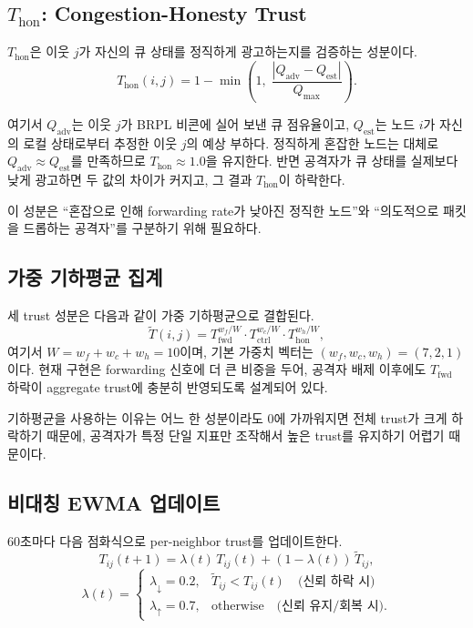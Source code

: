 \documentclass[12pt,a4paper]{article}
\begin{document}
\subsection{$T_\text{hon}$: Congestion-Honesty Trust}

$T_\text{hon}$은 이웃 $j$가 자신의 큐 상태를 정직하게 광고하는지를
검증하는 성분이다.
\begin{equation}
  T_\text{hon}(i,j) = 1 - \min\!\left(1,\; \frac{|Q_\text{adv} - Q_\text{est}|}{Q_\text{max}}\right).
\end{equation}

여기서 $Q_\text{adv}$는 이웃 $j$가 BRPL 비콘에 실어 보낸 큐 점유율이고,
$Q_\text{est}$는 노드 $i$가 자신의 로컬 상태로부터 추정한
이웃 $j$의 예상 부하다. 정직하게 혼잡한 노드는 대체로
$Q_\text{adv} \approx Q_\text{est}$를 만족하므로 $T_\text{hon} \approx 1.0$을 유지한다.
반면 공격자가 큐 상태를 실제보다 낮게 광고하면 두 값의 차이가 커지고,
그 결과 $T_\text{hon}$이 하락한다.

이 성분은 ``혼잡으로 인해 forwarding rate가 낮아진 정직한 노드''와
``의도적으로 패킷을 드롭하는 공격자''를 구분하기 위해 필요하다.

\subsection{가중 기하평균 집계}

세 trust 성분은 다음과 같이 가중 기하평균으로 결합된다.
\begin{equation}
  \tilde{T}(i,j) =
  T_\text{fwd}^{w_f/W}
  \cdot
  T_\text{ctrl}^{w_c/W}
  \cdot
  T_\text{hon}^{w_h/W},
\end{equation}
여기서 $W = w_f + w_c + w_h = 10$이며, 기본 가중치 벡터는
$(w_f, w_c, w_h) = (7, 2, 1)$이다.
현재 구현은 forwarding 신호에 더 큰 비중을 두어,
공격자 배제 이후에도 $T_\text{fwd}$ 하락이 aggregate trust에 충분히 반영되도록 설계되어 있다.

기하평균을 사용하는 이유는 어느 한 성분이라도 0에 가까워지면
전체 trust가 크게 하락하기 때문에, 공격자가 특정 단일 지표만 조작해서
높은 trust를 유지하기 어렵기 때문이다.

\subsection{비대칭 EWMA 업데이트}

60초마다 다음 점화식으로 per-neighbor trust를 업데이트한다.
\begin{equation}
  T_{ij}(t+1) = \lambda(t)\, T_{ij}(t) + (1-\lambda(t))\, \tilde{T}_{ij},
\end{equation}
\begin{equation}
  \lambda(t) =
  \begin{cases}
    \lambda_\downarrow = 0.2, & \tilde{T}_{ij} < T_{ij}(t)\quad \text{(신뢰 하락 시)} \\
    \lambda_\uparrow   = 0.7, & \text{otherwise}\quad \text{(신뢰 유지/회복 시).}
  \end{cases}
\end{equation}
\end{document}
